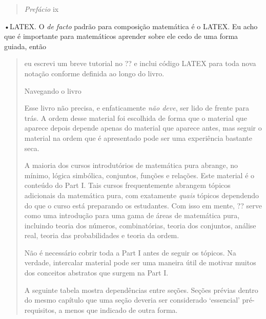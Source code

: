 \documentclass[
]{article}
\begin{document}
\begin{quote}
\emph{Prefácio} ix
\end{quote}

•LATEX. O \emph{de facto} padrão para composição matemática é o LATEX.
Eu acho que é importante para matemáticos aprender sobre ele cedo de uma
forma guiada, então

\begin{quote}
eu escrevi um breve tutorial no ?? e inclui código LATEX para toda nova
notação conforme definida ao longo do livro.

Navegando o livro

Esse livro não precisa, e enfaticamente \emph{não deve}, ser lido de
frente para trás. A ordem desse material foi escolhida de forma que o
material que aparece depois depende apenas do material que aparece
antes, mas seguir o material na ordem que é apresentado pode ser uma
experiência bastante seca.

A maioria dos cursos introdutórios de matemática pura abrange, no
mínimo, lógica simbólica, conjuntos, funções e relações. Este material é
o conteúdo do Part I. Tais cursos frequentemente abrangem tópicos
adicionais da matemática pura, com exatamente \emph{quais} tópicos
dependendo do que o curso está preparando os estudantes. Com isso em
mente, ?? serve como uma introdução para uma gama de áreas de matemática
pura, incluindo teoria dos números, combinatórias, teoria dos conjuntos,
análise real, teoria das probabilidades e teoria da ordem.

Não é necessário cobrir toda a Part I antes de seguir os tópicos. Na
verdade, intercalar material pode ser uma maneira útil de motivar muitos
dos conceitos abstratos que surgem na Part I.

A seguinte tabela mostra dependências entre seções. Seções prévias
dentro do mesmo capítulo que uma seção deveria ser considerado
`essencial' pré-requisitos, a menos que indicado de outra forma.
\end{quote}
\end{document}
